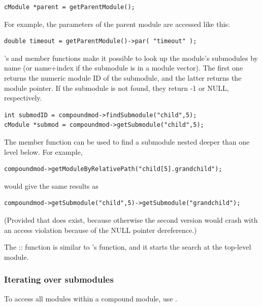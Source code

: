 \begin{verbatim}
cModule *parent = getParentModule();
\end{verbatim}

For example, the parameters of the parent module are accessed
like this:

\begin{verbatim}
double timeout = getParentModule()->par( "timeout" );
\end{verbatim}


's  and 
member functions make it possible to look up the module's submodules
by name (or name+index if the submodule
is in a module vector). The first one returns the numeric module ID of
the submodule, and the latter returns the module pointer.  If the
submodule is not found, they return -1 or NULL, respectively.

\begin{verbatim}
int submodID = compoundmod->findSubmodule("child",5);
cModule *submod = compoundmod->getSubmodule("child",5);
\end{verbatim}


The  member function can be used to find
a submodule nested deeper than one level below. For example,

\begin{verbatim}
compoundmod->getModuleByRelativePath("child[5].grandchild");
\end{verbatim}

would give the same results as

\begin{verbatim}
compoundmod->getSubmodule("child",5)->getSubmodule("grandchild");
\end{verbatim}

(Provided that  does exist, because otherwise the second
version would crash with an access violation because of the NULL
pointer dereference.)


The :: function is similar
to 's  function, and it
starts the search at the top-level module.


\subsubsection{Iterating over submodules}


To access all modules within a compound module,
use .

